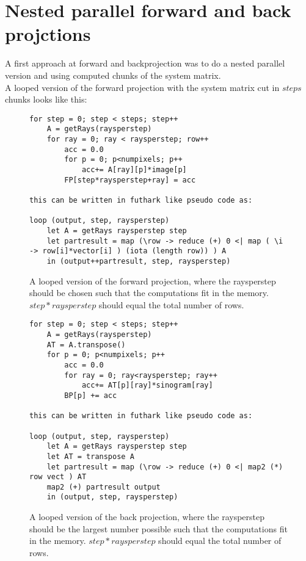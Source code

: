 \section{Nested parallel forward and back projctions}
A first approach at forward and backprojection was to do a nested parallel version and using computed chunks of the system matrix.\\
A looped version of the forward projection with the system matrix cut in $steps$ chunks looks like this:

\begin{figure}[h]
\begin{lstlisting}[frame=single]
for step = 0; step < steps; step++
	A = getRays(raysperstep)
	for ray = 0; ray < raysperstep; row++
		acc = 0.0
		for p = 0; p<numpixels; p++
			acc+= A[ray][p]*image[p]
		FP[step*raysperstep+ray] = acc

this can be written in futhark like pseudo code as:

loop (output, step, raysperstep)
	let A = getRays raysperstep step
	let partresult = map (\row -> reduce (+) 0 <| map ( \i -> row[i]*vector[i] ) (iota (length row)) ) A
	in (output++partresult, step, raysperstep)
\end{lstlisting}
\caption{A looped version of the forward projection, where the raysperstep should be chosen such that the computations fit in the memory. $step*raysperstep$ should equal the total number of rows.}
\end{figure}
\begin{figure}[h]
\begin{lstlisting}[frame=single]
for step = 0; step < steps; step++
	A = getRays(raysperstep)
	AT = A.transpose()
	for p = 0; p<numpixels; p++
		acc = 0.0
		for ray = 0; ray<raysperstep; ray++
			acc+= AT[p][ray]*sinogram[ray]
		BP[p] += acc

this can be written in futhark like pseudo code as:

loop (output, step, raysperstep)
	let A = getRays raysperstep step
	let AT = transpose A
	let partresult = map (\row -> reduce (+) 0 <| map2 (*) row vect ) AT
	map2 (+) partresult output
	in (output, step, raysperstep)
\end{lstlisting}
  \caption{A looped version of the back projection, where the raysperstep should be the largest number possible such that the computations fit in the memory. $step*raysperstep$ should equal the total number of rows.}
\end{figure}
